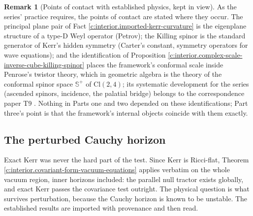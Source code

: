 \documentclass[11pt]{article}
\theoremstyle{definition}
\newtheorem{remark}[theorem]{Remark}
\theoremstyle{plain}
\newcommand{\changedmark}[2]{\marginpar{\raggedright\scriptsize\color{#1}#2}}
\providecommand{\CS}{}\renewcommand{\CS}{{\mathbb{S}^{+}}}
\providecommand{\Cl}{}\renewcommand{\Cl}{\mathrm{Cl}}
\begin{document}
\begin{remark}[Points of contact with established physics, kept in view]\label{c:note.interior.points-contact-established-physics-kept-view}
\changedmark{gray}{reworded}
As the series' practice requires, the points of contact are stated where they occur. The principal plane pair of Fact \ref{c:interior.imported-kerr-curvature} is the eigenplane structure of a type-D Weyl operator (Petrov); the Killing spinor is the standard generator of Kerr's hidden symmetry (Carter's constant, symmetry operators for wave equations); and the identification of Proposition \ref{c:interior.complex-scale-inverse-cube-killing-spinor} places the framework's conformal scale inside Penrose's twistor theory, which in geometric algebra is the theory of the conformal spinor space $\CS$ of $\Cl(2,4)$; its systematic development for the series (ascended spinors, incidence, the palatial bridge) belongs to the correspondence paper T9 \cite{ButlerT9}. Nothing in Parts one and two depended on these identifications; Part three's point is that the framework's internal objects coincide with them exactly.
\end{remark}

\subsection*{The perturbed Cauchy horizon}
\label{c:note.interior.setting-perturbed-cauchy-horizon}
Exact Kerr was never the hard part of the test. Since Kerr is Ricci-flat, Theorem \ref{c:interior.covariant-form-vacuum-equations} applies verbatim on the whole vacuum region, inner horizons included: the parallel null tractor exists globally, and exact Kerr passes the covariance test outright. The physical question is what survives perturbation, because the Cauchy horizon is known to be unstable. The established results are imported with provenance and then read.
\end{document}
